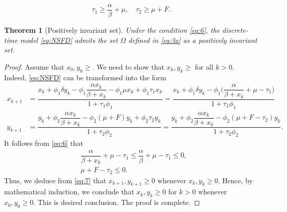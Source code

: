 \documentclass[10pt,a4paper]{amsart}
\newtheorem{theorem}{Theorem}
\begin{document}
\begin{equation}\label{eq:6}
\tau_1 \geq \dfrac{\alpha}{\beta} + \mu, \quad \tau_2 \geq \mu + F.
\end{equation}

\begin{theorem}[Positively invariant set]\label{Theorem1}
Under the condition \eqref{eq:6}, the discrete-time model \eqref{eq:NSFD} admits the set $\Omega$ defined in \eqref{eq:3a} as a positively invariant set.
\end{theorem}

\begin{proof}
Assume that $x_0, y_0 \geq$. We need to show that $x_k, y_k \geq$ for all $k > 0$. Indeed, \eqref{eq:NSFD} can be transformed into the form
\begin{equation}\label{eq:7}
\begin{split}
x_{k + 1} &= \dfrac{x_k + \phi_1\delta y_k - \phi_1\dfrac{\alpha x_{k}}{\beta + x_k}- \phi_1\mu x_{k} + \phi_1\tau_1x_k}{1 + \tau_1\phi_1} = \dfrac{x_k + \phi_1\delta y_k - \phi_1\bigg(\dfrac{\alpha}{\beta + x_k} +  \mu - \tau_1\bigg)}{1 + \tau_1\phi_1}\\
y_{k + 1} &= \dfrac{y_k + \phi_2\dfrac{\alpha x_{k}}{\beta + x_k} - \phi_2(\mu+F) y_{k} + \phi_2\tau_2y_k}{1 + \tau_2\phi_2} = \dfrac{y_k + \phi_2\dfrac{\alpha x_{k}}{\beta + x_k} - \phi_2(\mu+F - \tau_2)y_k}{1 + \tau_2\phi_2}.
\end{split}
\end{equation}
It follows from \eqref{eq:6} that
\begin{equation*}
\begin{split}
&\dfrac{\alpha}{\beta + x_k} +  \mu - \tau_1 \leq \dfrac{\alpha}{\beta} + \mu - \tau_1 \leq 0,\\
&\mu+F - \tau_2 \leq 0.
\end{split}
\end{equation*}
Thus, we deduce from \eqref{eq:7} that $x_{k + 1}, y_{k + 1} \geq 0$ whenever $x_k, y_k \geq 0$. Hence, by mathematical induction, we conclude that $x_k, y_k \geq 0$ for $k > 0$ whenever $x_0, y_0 \geq 0$. This is desired conclusion. The proof is complete.
\end{proof}
\end{document}
